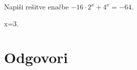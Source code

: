 \begin{vaja}
	Napiši rešitve enačbe $-16 \cdot 2^x+4^x=-64$.
  \begin{odgovor}
   	x=3.
  \end{odgovor}
\end{vaja}

\begin{vaja}
  \begin{odgovor}
   
  \end{odgovor}
\end{vaja}




\section{Odgovori}
\label{sec:explog-odgovori}




